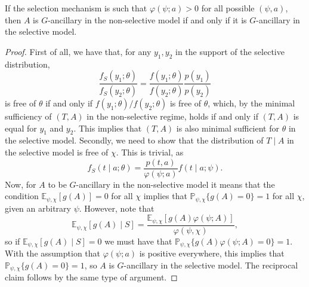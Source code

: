 \documentclass[10pt,a4paper]{amsart}
\begin{document}
\begin{proposition}\label{PROP: godambe}
If the selection mechanism is such that $\varphi(\psi; a) > 0$ for all possible $(\psi, a)$, then $A$ is $G$-ancillary in the non-selective model if and only if it is $G$-ancillary in the selective model.
\end{proposition} 

\begin{proof}
First of all, we have that, for any $y_1, y_2$ in the support of the selective distribution,
\begin{equation*}
\frac{f_S(y_1 ; \theta )}{f_S(y_2; \theta )} = \frac{f(y_1; \theta )}{f(y_2; \theta )}\frac{p(y_1)}{p(y_2)} 
\end{equation*}
is free of $\theta$ if and only if $f(y_1; \theta )/f(y_2; \theta )$ is free of $\theta$, which, by the minimal sufficiency of $(T, A)$ in the non-selective regime, holds if and only if $(T, A)$ is equal for $y_1$ and $y_2$. This implies that $(T, A)$ is also minimal sufficient for $\theta$ in the selective model. Secondly, we need to show that the distribution of $T\mid A$ in the selective model is free of $\chi$. This is trivial, as
\begin{equation*}\label{EQ: reducedconditionalmodel2}
f_{S}(t \mid  a ; \theta ) = \frac{p(t, a)}{\varphi(\psi;a)}   f(t\mid a; \psi).
\end{equation*}
Now, for $A$ to be $G$-ancillary in the non-selective model it means that the condition $\mathbb{E}_{\psi, \chi}[g(A)] = 0$ for all $\chi$ implies that $\mathbb{P}_{\psi, \chi}\{g(A) = 0\} = 1$ for all $\chi$, given an arbitrary $\psi$. However, note that 
\begin{equation*}
\mathbb{E}_{\psi, \chi}[g(A)\mid S] = \frac{\mathbb{E}_{\psi, \chi}[g(A)\varphi(\psi; A)]}{\varphi(\psi, \chi)},
\end{equation*}
so if $\mathbb{E}_{\psi, \chi}[g(A)\mid S] = 0$ we must have that $\mathbb{P}_{\psi, \chi}\{ g(A)\varphi(\psi; A) = 0\} = 1$. With the assumption that $\varphi(\psi; a) $ is positive everywhere, this implies that $\mathbb{P}_{\psi, \chi}\{ g(A) = 0\} = 1$, so $A$ is $G$-ancillary in the selective model. The reciprocal claim follows by the same type of argument.
\end{proof}
\end{document}
